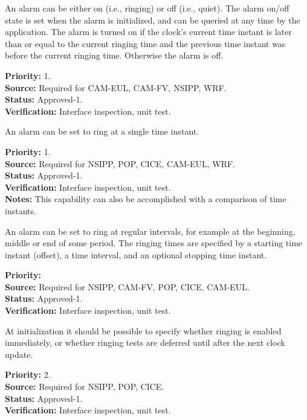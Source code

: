 An alarm can be either on (i.e., ringing) or off (i.e., quiet).
The alarm on/off state is set when the alarm is initialized, and can be queried
at any time by the application.  The alarm is turned on if the clock's current 
time instant is later than or equal to the current ringing time and the previous 
time instant was before the current ringing time.  Otherwise the alarm is off.
\begin{reqlist}
{\bf Priority:} 1. \\
{\bf Source:} Required for CAM-EUL, CAM-FV, NSIPP, WRF. \\
{\bf Status:} Approved-1. \\
{\bf Verification:} Interface inspection, unit test. 
\end{reqlist}


An alarm can be set to ring at a single time instant.
\begin{reqlist}
{\bf Priority:} 1. \\
{\bf Source:} Required for NSIPP, POP, CICE, CAM-EUL, WRF. \\
{\bf Status:} Approved-1. \\
{\bf Verification:} Interface inspection, unit test. \\
{\bf Notes:} This capability can also be accomplished with a comparison 
of time instants. 
\end{reqlist}

An alarm can be set to ring at regular intervals, for example
at the beginning, middle or end of some period.  The ringing times are 
specified by a starting time instant (offset), a time interval, and an optional 
stopping time instant.
\begin{reqlist}
{\bf Priority:} \\
{\bf Source:} Required for NSIPP, CAM-FV, POP, CICE, CAM-EUL. \\
{\bf Status:} Approved-1. \\
{\bf Verification:} Interface inspection, unit test.  
\end{reqlist}

At initialization it should be possible to
specify whether ringing is enabled immediately, or whether
ringing tests are deferred until after the next clock update.
\begin{reqlist}
{\bf Priority:} 2. \\
{\bf Source:} Required for NSIPP, POP, CICE. \\
{\bf Status:} Approved-1. \\
{\bf Verification:} Interface inspection, unit test.  
\end{reqlist}

